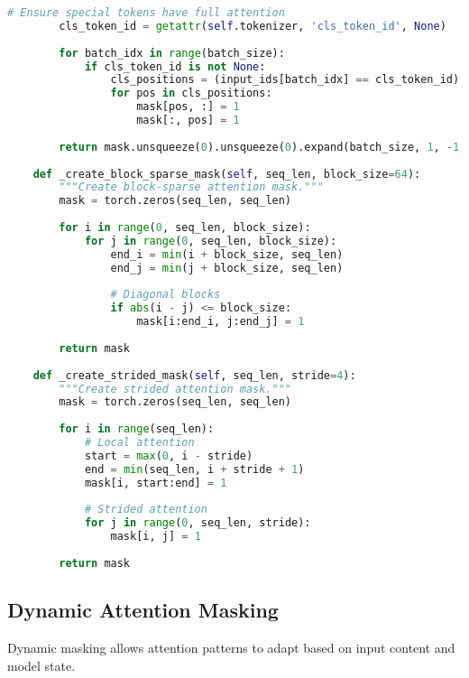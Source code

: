 \begin{lstlisting}[language=Python, caption=Advanced attention masking patterns]
        # Ensure special tokens have full attention
        cls_token_id = getattr(self.tokenizer, 'cls_token_id', None)
        
        for batch_idx in range(batch_size):
            if cls_token_id is not None:
                cls_positions = (input_ids[batch_idx] == cls_token_id).nonzero(as_tuple=True)[0]
                for pos in cls_positions:
                    mask[pos, :] = 1
                    mask[:, pos] = 1
                    
        return mask.unsqueeze(0).unsqueeze(0).expand(batch_size, 1, -1, -1).float()
        
    def _create_block_sparse_mask(self, seq_len, block_size=64):
        """Create block-sparse attention mask."""
        mask = torch.zeros(seq_len, seq_len)
        
        for i in range(0, seq_len, block_size):
            for j in range(0, seq_len, block_size):
                end_i = min(i + block_size, seq_len)
                end_j = min(j + block_size, seq_len)
                
                # Diagonal blocks
                if abs(i - j) <= block_size:
                    mask[i:end_i, j:end_j] = 1
                    
        return mask
        
    def _create_strided_mask(self, seq_len, stride=4):
        """Create strided attention mask."""
        mask = torch.zeros(seq_len, seq_len)
        
        for i in range(seq_len):
            # Local attention
            start = max(0, i - stride)
            end = min(seq_len, i + stride + 1)
            mask[i, start:end] = 1
            
            # Strided attention
            for j in range(0, seq_len, stride):
                mask[i, j] = 1
                
        return mask
\end{lstlisting}

\subsection{Dynamic Attention Masking}

Dynamic masking allows attention patterns to adapt based on input content and model state.

